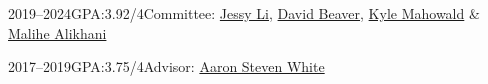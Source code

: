     {2019--2024}{\rmsc GPA:3.92/4}{Committee: \href{https://jessyli.com}{Jessy Li}, \href{https://liberalarts.utexas.edu/linguistics/faculty/dib97}{David Beaver}, \href{}{Kyle Mahowald} \& \href{}{Malihe Alikhani}}

    {2017--2019}{\rmsc GPA:3.75/4}{Advisor: \href{http://aaronstevenwhite.io}{Aaron Steven White}}

